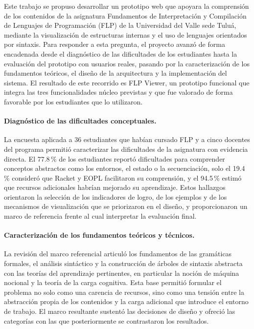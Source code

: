 Este trabajo se propuso desarrollar un prototipo web que apoyara la comprensión de los contenidos de la asignatura Fundamentos de Interpretación y Compilación de Lenguajes de Programación (FLP) de la Universidad del Valle sede Tuluá, mediante la visualización de estructuras internas y el uso de lenguajes orientados por sintaxis. Para responder a esta pregunta, el proyecto avanzó de forma encadenada desde el diagnóstico de las dificultades de los estudiantes hasta la evaluación del prototipo con usuarios reales, pasando por la caracterización de los fundamentos teóricos, el diseño de la arquitectura y la implementación del sistema. El resultado de este recorrido es FLP Viewer, un prototipo funcional que integra las tres funcionalidades núcleo previstas y que fue valorado de forma favorable por los estudiantes que lo utilizaron.

\paragraph{Diagnóstico de las dificultades conceptuales.} La encuesta aplicada a 36 estudiantes que habían cursado FLP y a cinco docentes del programa permitió caracterizar las dificultades de la asignatura con evidencia directa. El 77.8\,\% de los estudiantes reportó dificultades para comprender conceptos abstractos como los entornos, el estado o la secuenciación, solo el 19.4\,\% consideró que Racket y EOPL facilitaron su comprensión, y el 94.5\,\% estimó que recursos adicionales habrían mejorado su aprendizaje. Estos hallazgos orientaron la selección de los indicadores de logro, de los ejemplos y de los mecanismos de visualización que se priorizaron en el diseño, y proporcionaron un marco de referencia frente al cual interpretar la evaluación final.

\paragraph{Caracterización de los fundamentos teóricos y técnicos.} La revisión del marco referencial articuló los fundamentos de las gramáticas formales, el análisis sintáctico y la construcción de árboles de sintaxis abstracta con las teorías del aprendizaje pertinentes, en particular la noción de máquina nocional y la teoría de la carga cognitiva. Esta base permitió formular el problema no solo como una carencia de recursos, sino como una tensión entre la abstracción propia de los contenidos y la carga adicional que introduce el entorno de trabajo. El marco resultante sustentó las decisiones de diseño y ofreció las categorías con las que posteriormente se contrastaron los resultados.

